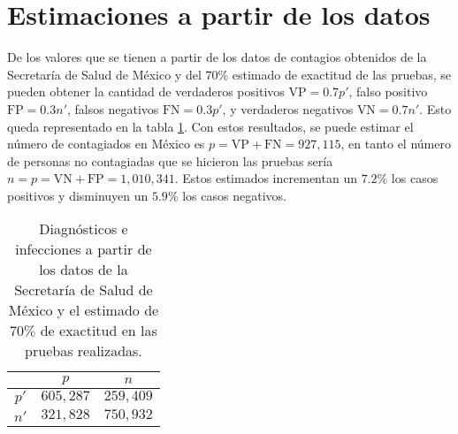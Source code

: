 \documentclass[paper=leter, fontsize=11pt]{scrartcl}
\numberwithin{equation}{section}		%
\numberwithin{figure}{section}			%
\numberwithin{table}{section}				%
\begin{document}
\section{Estimaciones a partir de los datos}
De los valores que se tienen a partir de los datos de contagios obtenidos de la Secretaría de Salud de México y del $70\%$ estimado de exactitud de las pruebas, se pueden obtener la cantidad de verdaderos positivos $\text{VP} = 0.7 p'$, falso positivo $\text{FP} = 0.3 n'$, falsos negativos $\text{FN} = 0.3 p'$, y verdaderos negativos $\text{VN} = 0.7 n'$. Esto queda representado en la tabla \ref{carac}. Con estos resultados, se puede estimar el número de contagiados en México es $p = \text{VP} + \text{FN} = 927, 115$, en tanto el número de personas no contagiadas que se hicieron las pruebas sería $n = p = \text{VN} + \text{FP} = 1,010,341$. Estos estimados incrementan un $7.2\%$ los casos positivos y disminuyen un $5.9\%$ los casos negativos.


\begin{table}[]
    \centering
    \caption{Diagnósticos e infecciones a partir de los datos de la Secretaría de Salud de México y el estimado de $70\%$ de exactitud en las pruebas realizadas.}
    \begin{tabular}{c|c|c|}
    \cline{2-3}
                               & $p$       & $n$       \\ \hline
    \multicolumn{1}{|c|}{$p'$} & $605,287$ & $259,409$  \\ \hline
    \multicolumn{1}{|c|}{$n'$} & $321,828$ & $750,932$ \\ \hline
    \end{tabular}
    \label{carac}
\end{table}



\end{document}
